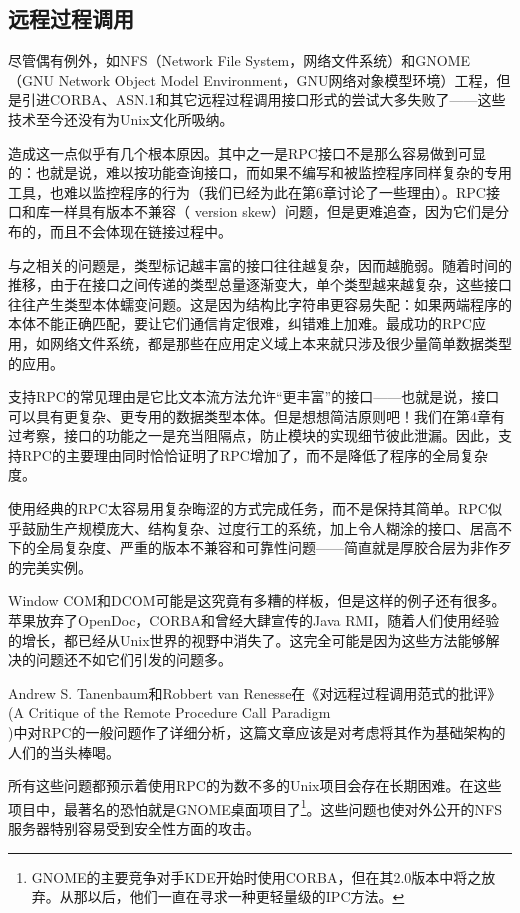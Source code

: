 \documentclass[12pt,oneside]{book}
\begin{document}
\subsection{远程过程调用}
尽管偶有例外，如NFS（Network File System，网络文件系统）和GNOME （GNU Network Object Model Environment，GNU网络对象模型环境）工程，但是引进CORBA、ASN.1和其它远程过程调用接口形式的尝试大多失败了——这些技术至今还没有为Unix文化所吸纳。

造成这一点似乎有几个根本原因。其中之一是RPC接口不是那么容易做到可显的：也就是说，难以按功能查询接口，而如果不编写和被监控程序同样复杂的专用工具，也难以监控程序的行为（我们已经为此在第6章讨论了一些理由）。RPC接口和库一样具有版本不兼容（ version skew）问题，但是更难追查，因为它们是分布的，而且不会体现在链接过程中。

与之相关的问题是，类型标记越丰富的接口往往越复杂，因而越脆弱。随着时间的推移，由于在接口之间传递的类型总量逐渐变大，单个类型越来越复杂，这些接口往往产生类型本体蠕变问题。这是因为结构比字符串更容易失配：如果两端程序的本体不能正确匹配，要让它们通信肯定很难，纠错难上加难。最成功的RPC应用，如网络文件系统，都是那些在应用定义域上本来就只涉及很少量简单数据类型的应用。

支持RPC的常见理由是它比文本流方法允许“更丰富”的接口——也就是说，接口可以具有更复杂、更专用的数据类型本体。但是想想简洁原则吧！我们在第4章有过考察，接口的功能之一是充当阻隔点，防止模块的实现细节彼此泄漏。因此，支持RPC的主要理由同时恰恰证明了RPC增加了，而不是降低了程序的全局复杂度。

使用经典的RPC太容易用复杂晦涩的方式完成任务，而不是保持其简单。RPC似乎鼓励生产规模庞大、结构复杂、过度行工的系统，加上令人糊涂的接口、居高不下的全局复杂度、严重的版本不兼容和可靠性问题——简直就是厚胶合层为非作歹的完美实例。

Window COM和DCOM可能是这究竟有多糟的样板，但是这样的例子还有很多。苹果放弃了OpenDoc，CORBA和曾经大肆宣传的Java RMI，随着人们使用经验的增长，都已经从Unix世界的视野中消失了。这完全可能是因为这些方法能够解决的问题还不如它们引发的问题多。

Andrew S. Tanenbaum和Robbert van Renesse在《对远程过程调用范式的批评》(A Critique of the Remote Procedure Call Paradigm \\ \cite{Tanenbaum-VanRenesse})中对RPC的一般问题作了详细分析，这篇文章应该是对考虑将其作为基础架构的人们的当头棒喝。

所有这些问题都预示着使用RPC的为数不多的Unix项目会存在长期困难。在这些项目中，最著名的恐怕就是GNOME桌面项目了\footnote{GNOME的主要竞争对手KDE开始时使用CORBA，但在其2.0版本中将之放弃。从那以后，他们一直在寻求一种更轻量级的IPC方法。}。这些问题也使对外公开的NFS服务器特别容易受到安全性方面的攻击。
\end{document}
